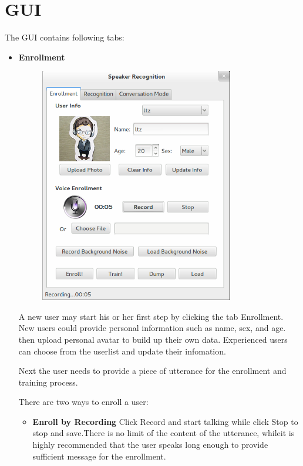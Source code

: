 \section{GUI}
\label{sec:gui}
The GUI contains following tabs:
\begin{itemize}
  \item \textbf{Enrollment} \\

    \begin{figure}[H]
      \centering
      \includegraphics[width=0.8\textwidth]{img/enrollment.png}
    \end{figure}

    A new user may start his or her first step by clicking the
    tab Enrollment. New users could provide personal information
    such as name, sex, and age. then upload personal avatar to
    build up their own data. Experienced users can choose from
    the userlist and update their infomation.

    Next the user needs to provide a piece of utterance for
    the enrollment and training process.

    There are two ways to enroll a user:
    \begin{itemize}
      \item \textbf{Enroll by Recording}
        Click Record and start talking while click Stop to stop
        and save.There is no limit of the content of the utterance,
        whileit is highly recommended that the user speaks long enough
        to provide sufficient message for the enrollment.


\end{itemize}
\end{itemize}
